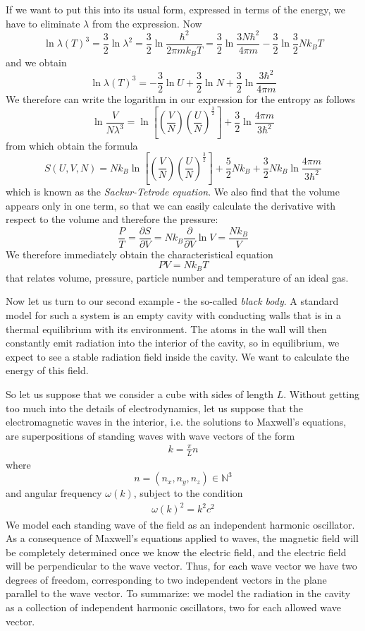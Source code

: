 \documentclass[a4paper, draft]{report}
\numberwithin{section}{chapter}
\numberwithin{equation}{chapter}
\theoremstyle{own}
\theoremstyle{remark}
\newcommand{\N}{\mathbb{N}}
\begin{document}
If we want to put this into its usual form, expressed in terms of the energy, we have to eliminate $\lambda$ from the expression. Now
$$
\ln \lambda(T)^3 = \frac{3}{2} \ln \lambda^2 = \frac{3}{2} \ln 
\frac{\hbar^2 }{2\pi m k_B T} = \frac{3}{2} \ln \frac{3 N \hbar^2 }{4\pi m} - 
\frac{3}{2} \ln \frac{3}{2} N k_B T
$$
and we obtain
$$
\ln \lambda(T)^3 = - \frac{3}{2} \ln U  + \frac{3}{2} \ln N 
+ \frac{3}{2} \ln \frac{3 \hbar^2 }{4\pi m}
$$
We therefore can write the logarithm in our expression for the entropy as follows
$$
\ln \frac{V}{N\lambda^3} = 
\ln \left[ (\frac{V}{N}) {(\frac{U}{N})}^{\frac{3}{2}} \right]
+ \frac{3}{2} \ln \frac{4\pi m}{3 \hbar^2}
$$
from which obtain the formula
$$
S(U,V,N) = N k_B \ln \left[ (\frac{V}{N}) {(\frac{U}{N})}^{\frac{3}{2}} \right]
+ \frac{5}{2} N k_B
+ \frac{3}{2} N k_B \ln \frac{4\pi m}{3 \hbar^2} 
$$
which is known as the {\em Sackur-Tetrode equation}. We also find that the volume appears only in one term, so that we can easily calculate the derivative with respect to the volume and therefore the pressure:
$$
\frac{P}{T} = 
\frac{\partial S}{\partial V} = 
N k_B\frac{\partial}{\partial V} \ln V = \frac{N k_B}{V}
$$
We therefore immediately obtain the characteristical equation
$$
P V = N k_B T
$$
that relates volume, pressure, particle number and temperature of an ideal gas.


Now let us turn to our second example - the so-called {\em black body}. A standard model for such a system is an empty cavity with conducting walls that is in a thermal equilibrium with its environment. The atoms in the wall will then constantly emit radiation into the interior of the cavity, so in equilibrium, we expect to see a stable radiation field inside the cavity. We want to calculate the energy of this field.

So let us suppose that we consider a cube with sides of length $L$. Without getting too much into the details of electrodynamics, let us suppose that the electromagnetic waves in the interior, i.e. the solutions to Maxwell's equations, are superpositions of standing waves with wave vectors of the form 
\begin{align}\label{eq:allowedwavectors}
k = \frac{\pi}{L} n
\end{align}
where 
$$
n = (n_x, n_y, n_z) \in {\N}^3
$$
and angular frequency $\omega(k)$, subject to the condition
\begin{align}\label{eq:dispersionrelation}
\omega(k)^2 = k^2 c^2
\end{align}
We model each standing wave of the field as an independent harmonic oscillator. As a consequence of Maxwell's equations applied to waves, the magnetic field will be completely determined once we know the electric field, and the electric field will be perpendicular to the wave vector. Thus, for each wave vector we have two degrees of freedom, corresponding to two independent vectors in the plane parallel to the wave vector. To summarize: we model the radiation in the cavity as a collection of independent harmonic oscillators, two for each allowed wave vector.
\end{document}
